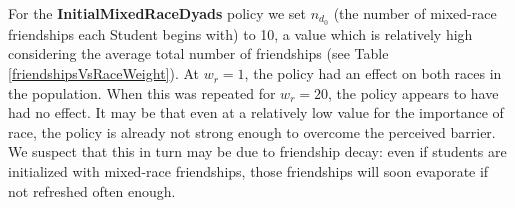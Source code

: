 For the {\bf InitialMixedRaceDyads} policy we set $n_{d_0}$ (the number of
mixed-race friendships each Student begins with) to 10, a value which is
relatively high considering the average total number of friendships (see Table
\ref{friendshipsVsRaceWeight}). At $w_r=1$, the policy had an effect on both
races in the population. When this was repeated for $w_r=20$, the policy
appears to have had no effect. It may be that even at a relatively low value
for the importance of race, the policy is already not strong enough to
overcome the perceived barrier. We suspect that this in turn may be due to
friendship decay: even if students are initialized with mixed-race
friendships, those friendships will soon evaporate if not refreshed often
enough.
